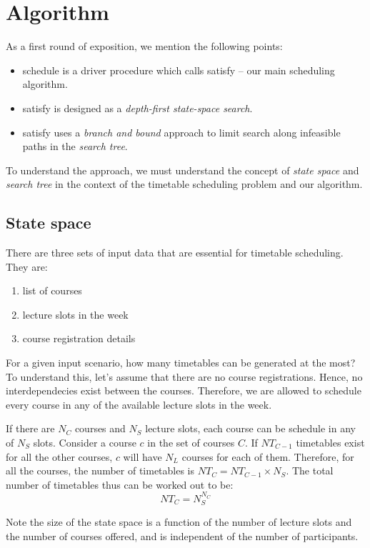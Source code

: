 \documentclass[11pt,a4paper]{article}
\begin{document}
\section{Algorithm}
As a first round of exposition, we mention the following points:
\begin{itemize}
	\item \textsf{schedule} is a driver procedure which calls \textsf{satisfy} -- our main scheduling algorithm.
	\item \textsf{satisfy} is designed as a \emph{depth-first state-space search}.
	\item \textsf{satisfy} uses a \emph{branch and bound} approach to limit search along infeasible paths in the \emph{search tree}.
\end{itemize}

To understand the approach, we must understand the concept of \emph{state space} and \emph{search tree} in the context of the timetable scheduling problem and our algorithm.

\subsection{State space}
There are three sets of input data that are essential for timetable scheduling. They are:
\begin{enumerate}
	\item list of courses
	\item lecture slots in the week
	\item course registration details
\end{enumerate}
For a given input scenario, how many timetables can be generated at the most? To understand this, let's assume that there are no course registrations. Hence, no interdependecies exist between the courses. Therefore, we are allowed to schedule every course in any of the available lecture slots in the week.

If there are $N_C$ courses and $N_S$ lecture slots, each course can be schedule in any of $N_S$ slots. Consider a course $c$ in the set of courses $C$. If $NT_{C-1}$ timetables exist for all the other courses, $c$ will have $N_L$ courses for each of them. Therefore, for all the courses, the number of timetables is $NT_C = NT_{C-1} \times N_S$. The total number of timetables thus can be worked out to be:
\begin{equation}
NT_C = N_S^{N_C} 
\end{equation}

Note the size of the state space is a function of the number of lecture slots and the number of courses offered, and is independent of the number of participants.
\end{document}
